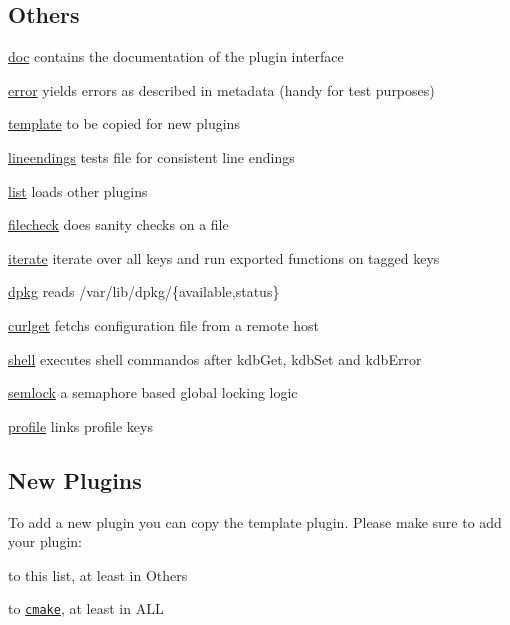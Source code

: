 \subsection*{Others}


\begin{DoxyItemize}
\item \hyperlink{md_src_plugins_doc_README_src_plugins_doc_README_md}{doc} contains the documentation of the plugin interface
\item \hyperlink{md_src_plugins_error_README_src_plugins_error_README_md}{error} yields errors as described in metadata (handy for test purposes)
\item \hyperlink{md_src_plugins_template_README_src_plugins_template_README_md}{template} to be copied for new plugins
\item \hyperlink{md_src_plugins_lineendings_README_src_plugins_lineendings_README_md}{lineendings} tests file for consistent line endings
\item \hyperlink{md_src_plugins_list_README_src_plugins_list_README_md}{list} loads other plugins
\item \hyperlink{md_src_plugins_filecheck_README_src_plugins_filecheck_README_md}{filecheck} does sanity checks on a file
\item \hyperlink{md_src_plugins_iterate_README_src_plugins_iterate_README_md}{iterate} iterate over all keys and run exported functions on tagged keys
\item \hyperlink{md_src_plugins_dpkg_README_src_plugins_dpkg_README_md}{dpkg} reads /var/lib/dpkg/\{available,status\}
\item \hyperlink{md_src_plugins_curlget_README_src_plugins_curlget_README_md}{curlget} fetchs configuration file from a remote host
\item \hyperlink{md_src_plugins_shell_README_src_plugins_shell_README_md}{shell} executes shell commandos after kdb\+Get, kdb\+Set and kdb\+Error
\item \hyperlink{md_src_plugins_semlock_README_src_plugins_semlock_README_md}{semlock} a semaphore based global locking logic
\item \hyperlink{md_src_plugins_profile_README_src_plugins_profile_README_md}{profile} links profile keys
\end{DoxyItemize}

\subsection*{New Plugins}

To add a new plugin you can copy the template plugin. Please make sure to add your plugin\+:


\begin{DoxyItemize}
\item to this list, at least in Others
\item to \href{/home/markus/Projekte/Elektra/current/cmake/ElektraCache.cmake}{\tt cmake}, at least in A\+L\+L 
\end{DoxyItemize}